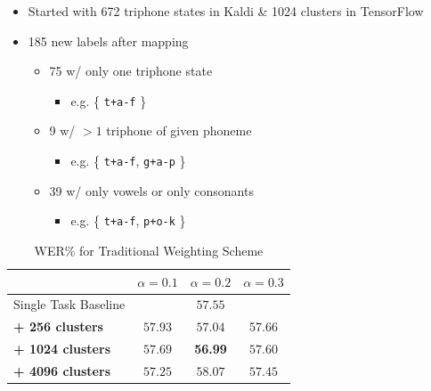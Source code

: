 \documentclass[a4paper]{article}
\begin{document}
\begin{itemize}
\item Started with 672 triphone states in Kaldi \& 1024 clusters in TensorFlow
\item 185 new labels after mapping
  \begin{itemize}
  \item 75 w/ only one triphone state
    \begin{itemize}
    \item e.g. \{ \texttt{t+a-f} \}
    \end{itemize}
  \item 9 w/ $>1$ triphone of given phoneme
    \begin{itemize}
    \item e.g. \{ \texttt{t+a-f}, \texttt{g+a-p} \}
    \end{itemize}
  \item 39 w/ only vowels or only consonants
    \begin{itemize}
    \item e.g. \{ \texttt{t+a-f}, \texttt{p+o-k} \}
    \end{itemize}
  \end{itemize}
\end{itemize}



\begin{table}[!htbp]
  \centering
  \caption{WER\% for Traditional Weighting Scheme}
  \begin{adjustbox}{width=\textwidth}
    \begin{tabular}{lccc}
      \toprule
      & $\alpha = 0.1 $ & $\alpha = 0.2 $ & $\alpha = 0.3 $\\
      \midrule
      Single Task Baseline  &  \multicolumn{3}{c}{$57.55$ \raisebox{.33\height}{\footnotesize{$\pm 1.82$}}}     \\
      
      \textbf{+ 256 clusters}  &  $57.93$ \raisebox{.33\height}{\footnotesize{$\pm 1.63$}}   &  $57.04$ \raisebox{.33\height}{\footnotesize{$\pm 1.58$}}     & 57.66 \raisebox{.33\height}{\footnotesize{$\pm 1.24$}} \\
      
      \textbf{+ 1024 clusters}   & $57.69$ \raisebox{.33\height}{\footnotesize{$\pm 3.78$}}    & \textbf{56.99} \raisebox{.33\height}{\footnotesize{$\pm 3.08$}}    & $57.60$ \raisebox{.33\height}{\footnotesize{$\pm 0.79$}}  \\
      
      \textbf{+ 4096 clusters}   &  $57.25$ \raisebox{.33\height}{\footnotesize{$\pm 2.87$}}  & $58.07$ \raisebox{.33\height}{\footnotesize{$\pm 1.35$}}   &   $57.45$ \raisebox{.33\height}{\footnotesize{$\pm 0.32$}}  \\
      \bottomrule
    \end{tabular}
  \end{adjustbox}
\end{table}
\end{document}
